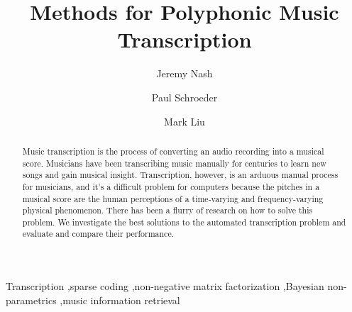 \documentclass[5p]{elsarticle}
\begin{document}
\begin{frontmatter}

%
\title{Methods for Polyphonic Music Transcription} %
\author[eadd]{Jeremy Nash}
\author[eadd]{Paul Schroeder}
\address[eadd]{Electrical Engineering Department, University of Michigan, Ann Arbor, MI 48109}
\author[csadd]{Mark Liu}
\address[csadd]{Computer Science Department, University of Michigan, Ann Arbor, MI 48109}










%

\begin{abstract}


Music transcription is the process of converting an audio recording into a musical score.
Musicians have been transcribing music manually for centuries to learn new songs and gain musical insight.
Transcription, however, is an arduous manual process for musicians, and it's a difficult problem for computers because the pitches in a musical score are the human perceptions of a time-varying and frequency-varying physical phenomenon.
There has been a flurry of research on how to solve this problem.
We investigate the best solutions to the automated transcription problem and evaluate and compare their performance.







\end{abstract}
\begin{keyword}
Transcription \sep sparse coding \sep non-negative matrix factorization \sep Bayesian non-parametrics \sep music information retrieval
\end{keyword}

\end{frontmatter}
\end{document}
